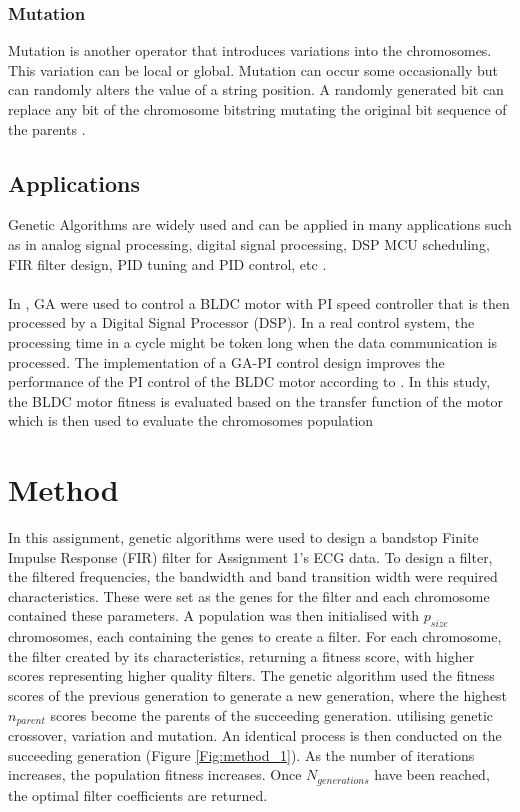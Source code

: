 \documentclass[a4paper, 11pt]{article}
\begin{document}
        \subsubsection{Mutation}
            Mutation is another operator that introduces variations into the chromosomes. This variation can be
            local or global. Mutation can occur some occasionally but can randomly alters the value of a string
            position. A randomly generated bit can replace any bit of the chromosome bitstring mutating the original
            bit sequence of the parents \cite{Tang1996}.

        \subsection{Applications}
        Genetic Algorithms are widely used and can be applied in many applications such as in analog signal processing, 
        digital signal processing, DSP MCU scheduling, FIR filter design, PID tuning and PID control, etc 
        \cite{Chen2017, Fleming1993, Cao2012, Fabijanski2008, Miyata2018, Amphlett1996}.
        \\\\
        In \cite{Chen2017}, GA were used to control a BLDC motor with PI speed controller that is then processed by 
        a Digital Signal Processor (DSP). In a real control system, the processing time in a cycle might be token long
        when the data communication is processed. The implementation of a GA-PI control design improves the performance of
        the PI control of the BLDC motor according to \cite{Chen2017}. In this study, the BLDC motor fitness is evaluated
        based on the transfer function of the motor which is then used to evaluate the chromosomes population 


\section{Method}\label{sec:meth}
    In this assignment, genetic algorithms were used to design a bandstop Finite Impulse Response (FIR) filter for Assignment 1's 
    ECG data. To design a filter, the filtered frequencies, the bandwidth and band transition width  were required 
    characteristics. These were set as the genes for the filter and each chromosome contained these parameters.
    A population was then initialised with $p_{size}$ chromosomes, each containing the genes to create a filter. 
    For each chromosome, the filter created by its characteristics, returning a fitness score, with higher scores 
    representing higher quality filters. The genetic algorithm used the fitness scores of the previous generation
    to generate a new generation, where the highest $n_{parent}$ scores become the parents of the succeeding generation. 
    utilising genetic crossover, variation and mutation. An identical process is then conducted on the succeeding generation (Figure \ref{Fig:method_1}). 
    As the number of iterations increases, the population fitness increases. Once $N_{generations}$ have been reached, the
    optimal filter coefficients are returned. 
\end{document}
